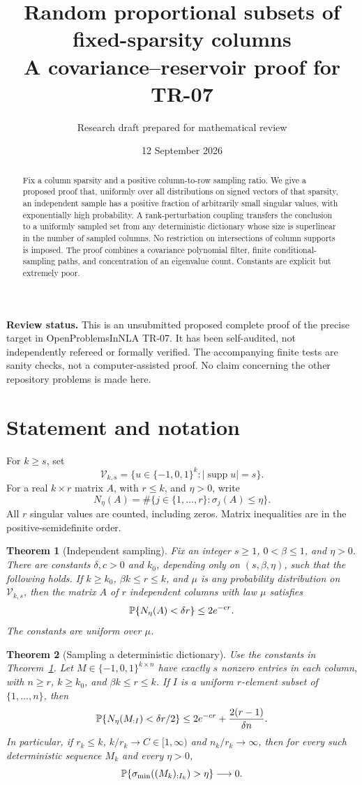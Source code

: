 \documentclass[11pt]{article}
\title{Random proportional subsets of fixed-sparsity columns\\[3pt]\large A covariance--reservoir proof for TR-07}
\author{Research draft prepared for mathematical review}
\date{12 September 2026}
\newtheorem{theorem}{Theorem}
\theoremstyle{remark}\newtheorem{remark}[theorem]{Remark}
\newcommand{\supp}{\operatorname{supp}}
\begin{document}
\maketitle
\begin{abstract}
Fix a column sparsity and a positive column-to-row sampling ratio. We give a proposed proof that, uniformly over all distributions on signed vectors of that sparsity, an independent sample has a positive fraction of arbitrarily small singular values, with exponentially high probability. A rank-perturbation coupling transfers the conclusion to a uniformly sampled set from any deterministic dictionary whose size is superlinear in the number of sampled columns. No restriction on intersections of column supports is imposed. The proof combines a covariance polynomial filter, finite conditional-sampling paths, and concentration of an eigenvalue count. Constants are explicit but extremely poor.
\end{abstract}
\noindent\textbf{Review status.} This is an unsubmitted proposed complete proof of the precise target in OpenProblemsInNLA TR-07. It has been self-audited, not independently refereed or formally verified. The accompanying finite tests are sanity checks, not a computer-assisted proof. No claim concerning the other repository problems is made here.

\section{Statement and notation}
For $k\ge s$, set
\[
 \mathcal V_{k,s}=\{u\in\{-1,0,1\}^k:|\supp u|=s\}.
\]
For a real $k\times r$ matrix $A$, with $r\le k$, and $\eta>0$, write
\[
 N_\eta(A)=\#\{j\in\{1,\dots,r\}:\sigma_j(A)\le\eta\}.
\]
All $r$ singular values are counted, including zeros. Matrix inequalities are in the positive-semidefinite order.

\begin{theorem}[Independent sampling]\label{thm:iid}
Fix an integer $s\ge1$, $0<\beta\le1$, and $\eta>0$. There are constants $\delta,c>0$ and $k_0$, depending only on $(s,\beta,\eta)$, such that the following holds. If $k\ge k_0$, $\beta k\le r\le k$, and $\mu$ is any probability distribution on $\mathcal V_{k,s}$, then the matrix $A$ of $r$ independent columns with law $\mu$ satisfies
\[
 \mathbb P\{N_\eta(A)<\delta r\}\le 2e^{-cr}.
\]
The constants are uniform over $\mu$.
\end{theorem}

\begin{theorem}[Sampling a deterministic dictionary]\label{thm:distinct}
Use the constants in Theorem~\ref{thm:iid}. Let $M\in\{-1,0,1\}^{k\times n}$ have exactly $s$ nonzero entries in each column, with $n\ge r$, $k\ge k_0$, and $\beta k\le r\le k$. If $I$ is a uniform $r$-element subset of $\{1,\dots,n\}$, then
\begin{equation}\label{eq:finite}
 \mathbb P\{N_\eta(M_{:I})<\delta r/2\}
 \le 2e^{-cr}+\frac{2(r-1)}{\delta n}.
\end{equation}
In particular, if $r_k\le k$, $k/r_k\to C\in[1,\infty)$ and $n_k/r_k\to\infty$, then for every such deterministic sequence $M_k$ and every $\eta>0$,
\[
 \mathbb P\{\sigma_{\min}((M_k)_{:I_k})>\eta\}\longrightarrow0.
\]
\end{theorem}
\end{document}
